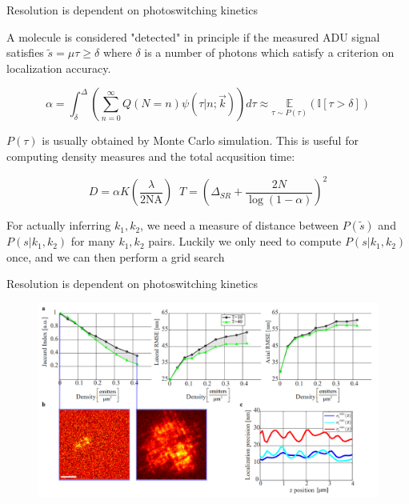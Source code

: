 \documentclass{beamer}					%
\begin{document}
\begin{frame}{Resolution is dependent on photoswitching kinetics}

A molecule is considered "detected" in principle if the measured ADU signal satisfies $\tilde{s} =\mu\tau \geq \delta$ where $\delta$ is a number of photons which satisfy a criterion on localization accuracy.

\begin{equation*}
\alpha = \int_{\delta}^{\Delta}\left(\sum_{n=0}^{\infty}Q(N=n)\psi(\tau|n;\vec{k})\right)d\tau \approx \underset{\tau\sim P(\tau)}{\mathbb{E}}\left(\mathbb{I}[\tau > \delta]\right)
\end{equation*}

$P(\tau)$ is usually obtained by Monte Carlo simulation. This is useful for computing density measures and the total acqusition time:

\begin{equation*}
D = \alpha K\left(\frac{\lambda}{2\mathrm{NA}}\right)\;\; T = \left(\Delta_{SR}+\frac{2N}{\log(1-\alpha)}\right)^{2}
\end{equation*}

For actually inferring $k_{1},k_{2}$, we need a measure of distance between $P(\tilde{s})$ and $P(s|k_{1},k_{2})$ for many $k_{1},k_{2}$ pairs. Luckily we only need to compute $P(s|k_{1},k_{2})$ once, and we can then perform a grid search

\end{frame}

\begin{frame}{Resolution is dependent on photoswitching kinetics}
\begin{figure}
\includegraphics[width=12cm]{Jaccard.png}
\end{figure}
\end{frame}
\end{document}
